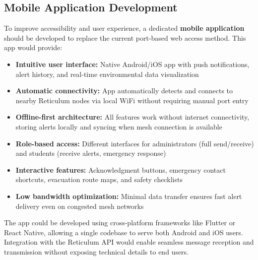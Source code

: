 \subsection{Mobile Application Development}
To improve accessibility and user experience, a dedicated \textbf{mobile application} should be developed to replace the current port-based web access method. This app would provide:
\begin{itemize}
    \item \textbf{Intuitive user interface:} Native Android/iOS app with push notifications, alert history, and real-time environmental data visualization
    \item \textbf{Automatic connectivity:} App automatically detects and connects to nearby Reticulum nodes via local WiFi without requiring manual port entry
    \item \textbf{Offline-first architecture:} All features work without internet connectivity, storing alerts locally and syncing when mesh connection is available
    \item \textbf{Role-based access:} Different interfaces for administrators (full send/receive) and students (receive alerts, emergency response)
    \item \textbf{Interactive features:} Acknowledgment buttons, emergency contact shortcuts, evacuation route maps, and safety checklists
    \item \textbf{Low bandwidth optimization:} Minimal data transfer ensures fast alert delivery even on congested mesh networks
\end{itemize}

The app could be developed using cross-platform frameworks like Flutter or React Native, allowing a single codebase to serve both Android and iOS users. Integration with the Reticulum API would enable seamless message reception and transmission without exposing technical details to end users.

